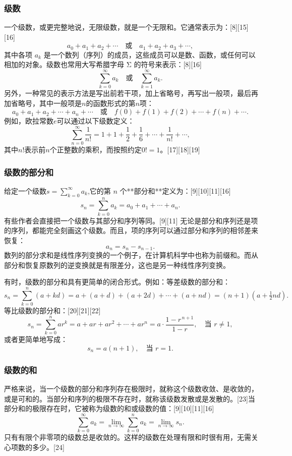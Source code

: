 \subsubsection{级数}
一个级数，或更完整地说，无限级数，就是一个无限和。它通常表示为：[8][15][16]
$$
a_{0} + a_{1} + a_{2} + \cdots \quad \text{或} \quad a_{1} + a_{2} + a_{3} + \cdots ,~
$$
其中各项 $a_{k}$ 是一个数列（序列）的成员，这些成员可以是数、函数，或任何可以相加的对象。级数也常用大写希腊字母 Σ 的符号来表示：[8][16]
$$
\sum_{k=0}^{\infty} a_{k} \quad \text{或} \quad \sum_{k=1}^{\infty} a_{k}.~
$$
另外，一种常见的表示方法是写出前若干项，加上省略号，再写出一般项，最后再加省略号，其中一般项是$n$的函数形式的第$n$项：
$$
a_{0} + a_{1} + a_{2} + \cdots + a_{n} + \cdots 
\quad \text{或} \quad 
f(0) + f(1) + f(2) + \cdots + f(n) + \cdots .~
$$
例如，欧拉常数$e$可以通过以下级数定义：
$$
\sum_{n=0}^{\infty} \frac{1}{n!} 
= 1 + 1 + \frac{1}{2} + \frac{1}{6} + \cdots + \frac{1}{n!} + \cdots ,~
$$
其中$n!$表示前$n$个正整数的乘积，而按照约定$0! = 1$。[17][18][19]
\subsubsection{级数的部分和}
给定一个级数$s = \sum_{k=0}^{\infty} a_k $,它的第 $n$ 个**部分和**定义为：[9][10][11][16]
$$
s_{n} = \sum_{k=0}^{n} a_k = a_0 + a_1 + \cdots + a_n .~
$$
有些作者会直接把一个级数与其部分和序列等同。[9][11] 无论是部分和序列还是项的序列，都能完全刻画这个级数。而且，项的序列可以通过部分和序列的相邻差来恢复：
$$
a_{n} = s_{n} - s_{n-1}.~
$$
数列的部分求和是线性序列变换的一个例子，在计算机科学中也称为前缀和。而从部分和恢复原数列的逆变换就是有限差分，这也是另一种线性序列变换。

有时，级数的部分和具有更简单的闭合形式。例如：等差级数的部分和：
$$
s_{n} = \sum_{k=0}^{n} (a + kd) 
= a + (a+d) + (a+2d) + \cdots + (a+nd) 
= (n+1)\left(a + \tfrac{1}{2}nd\right) .~
$$
等比级数的部分和：[20][21][22]
$$
s_{n} = \sum_{k=0}^{n} ar^{k} 
= a + ar + ar^{2} + \cdots + ar^{n} 
= a \cdot \frac{1-r^{\,n+1}}{1-r}, \quad \text{当 } r \neq 1,~
$$
或者更简单地写成：
$$
s_{n} = a(n+1), \quad \text{当 } r = 1.~
$$
\subsubsection{级数的和}
严格来说，当一个级数的部分和序列存在极限时，就称这个级数收敛、是收敛的，或是可和的。当部分和序列的极限不存在时，就称该级数发散或是发散的。[23]当部分和的极限存在时，它被称为级数的和或级数的值：[9][10][11][16]
$$
\sum_{k=0}^{\infty} a_{k} 
= \lim_{n \to \infty} \sum_{k=0}^{n} a_{k} 
= \lim_{n \to \infty} s_{n}.~
$$
只有有限个非零项的级数总是收敛的。这样的级数在处理有限和时很有用，无需关心项数的多少。[24]

